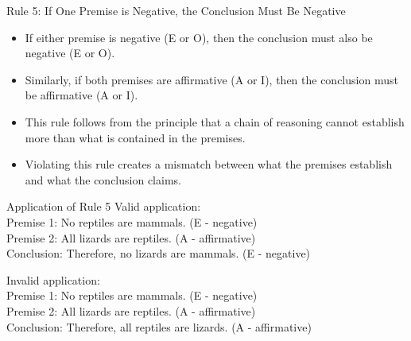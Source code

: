 \documentclass{beamer}
\begin{document}
	\begin{frame}{Rule 5: If One Premise is Negative, the Conclusion Must Be Negative}
		\begin{itemize}
			\item If either premise is negative (E or O), then the conclusion must also be negative (E or O).
			\item Similarly, if both premises are affirmative (A or I), then the conclusion must be affirmative (A or I).
			\item This rule follows from the principle that a chain of reasoning cannot establish more than what is contained in the premises.
			\item Violating this rule creates a mismatch between what the premises establish and what the conclusion claims.
		\end{itemize}
		
		\begin{block}{Application of Rule 5}
			\scriptsize
			Valid application:\\
			Premise 1: No reptiles are mammals. (E - negative)\\
			Premise 2: All lizards are reptiles. (A - affirmative)\\
			Conclusion: Therefore, no lizards are mammals. (E - negative)
			
			Invalid application:\\
			Premise 1: No reptiles are mammals. (E - negative)\\
			Premise 2: All lizards are reptiles. (A - affirmative)\\
			Conclusion: Therefore, all reptiles are lizards. (A - affirmative)
		\end{block}
	\end{frame}
	
\end{document}

